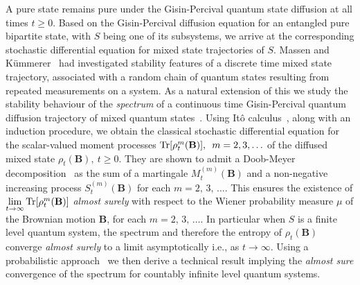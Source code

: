 A pure state remains pure under the Gisin-Percival quantum state diffusion at all times $t\geq 0$. Based on the Gisin-Percival diffusion equation for an entangled pure bipartite state, with $S$ being one of its subsystems, we arrive at the corresponding stochastic differential equation for mixed state trajectories of $S$. Massen and K{\"u}mmerer~\cite{key36} had  investigated  stability features of a discrete time mixed state trajectory, associated with a random chain of quantum states resulting from repeated measurements on a system. As a natural extension of this  we study the stability behaviour of the {\em spectrum} of a continuous time Gisin-Percival quantum diffusion trajectory of mixed quantum states~\cite{key37}. Using It{\^o} calculus~\cite{key38}, along with an induction procedure, we obtain the classical stochastic differential  equation for the scalar-valued moment processes  ${\rm Tr}[\rho_t^m( \mathbf{B})], \,\,\, m=2,3,\ldots$  of the diffused mixed state  $\rho_t(\mathbf{B}), \  t\geq 0$. They are shown to admit a Doob-Meyer decomposition~\cite{key39,key40} as the sum of a martingale $M^{(m)}_t(\mathbf{B})$ and a non-negative increasing process $S^{(m)}_t(\mathbf{B})$ for each $m=2,\, 3,\, \ldots$. This ensures the existence of  $\underset{t\rightarrow\infty}{\lim}\, {\rm Tr}[\rho_t^m( \mathbf{B})]$ {\em almost surely} with respect to the Wiener probability measure $\mu$ of the Brownian motion $\mathbf{B}$, for each $m=2,\, 3,\, \ldots$. In particular when  $S$ is a finite level quantum system, the spectrum and therefore the entropy of $\rho_t (\mathbf{B})$ converge {\em almost surely} to a limit asymptotically i.e., as $t\rightarrow \infty$. Using a probabilistic approach~\cite{key41,key42} we then derive a technical result implying the {\em almost sure} convergence of the spectrum for countably infinite level quantum systems. 

